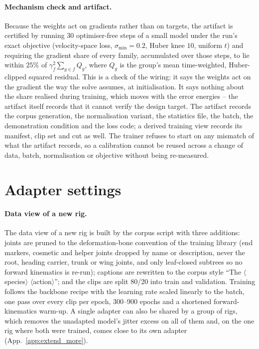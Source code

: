 \paragraph{Mechanism check and artifact.} Because the weights act on gradients rather than on
targets, the artifact is certified by running $30$ optimiser-free steps of a small model under the
run's exact objective (velocity-space loss, $\sigma_{\min}{=}0.2$, Huber knee $10$, uniform $t$) and
requiring the gradient share of every family, accumulated over those steps, to lie within $25\%$ of
$\gamma_f^2\sum_{g\in f} Q_g$, where $Q_g$ is the group's mean time-weighted, Huber-clipped squared residual.
This is a check of the wiring: it says the weights act on the gradient the way the solve assumes, at
initialisation. It says nothing about the share realised during training, which moves with the error
energies -- the artifact itself records that it cannot verify the design target. The artifact records
the corpus generation, the normalisation variant, the statistics file, the batch, the demonstration
condition and the loss code; a derived training view records its manifest, clip set and cut as well. The
trainer refuses to start on any mismatch of what the artifact records, so a calibration cannot be
reused across a change of data, batch, normalisation or objective without being re-measured.

\section{Adapter settings}\label{app:lora}

\paragraph{Data view of a new rig.} The
data view of a new rig is built by the corpus script with three additions: joints are pruned to the
deformation-bone convention of the training library (end markers, cosmetic and helper joints
dropped by name or description, never the root, heading carrier, trunk or wing joints, and only
leaf-closed subtrees so no forward kinematics is re-run); captions are rewritten to the corpus style
``The $\langle$species$\rangle$ $\langle$action$\rangle$''; and the clips are split 80/20 into
train and validation. Training follows the backbone recipe with the
learning rate scaled linearly to the batch, one pass over every clip per epoch, 300--900 epochs and
a shortened forward-kinematics warm-up. A single adapter can also be shared by a group of rigs, which removes the
unadapted model's jitter excess on all of them and, on the one rig where both were trained, comes close to
its own adapter (App.~\ref{app:extend_more}).

